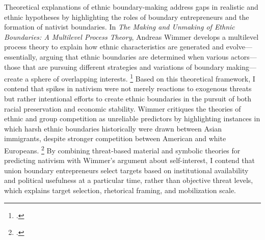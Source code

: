 \documentclass[12pt,a4paper]{article}
\begin{document}
Theoretical explanations of ethnic boundary-making address gaps in realistic and ethnic hypotheses by highlighting the roles of boundary entrepreneurs and the formation of nativist boundaries. In \textit{The Making and Unmaking of Ethnic Boundaries: A Multilevel Process Theory}, Andreas Wimmer develops a multilevel process theory to explain how ethnic characteristics are generated and evolve—essentially, arguing that ethnic boundaries are determined when various actors---those that are pursuing different strategies and variations of boundary making---create a sphere of overlapping interests. \footcite{wimmer_making_2008} Based on this theoretical framework, I contend that spikes in nativism were not merely reactions to exogenous threats but rather intentional efforts to create ethnic boundaries in the pursuit of both racial preservation and economic stability. Wimmer critiques the theories of ethnic and group competition as unreliable predictors by highlighting instances in which harsh ethnic boundaries historically were drawn between Asian immigrants, despite stronger competition between American and white Europeans. \footcite{wimmer_making_2008} By combining threat-based material and symbolic theories for predicting nativism with Wimmer's argument about self-interest, I contend that union boundary entrepreneurs select targets based on institutional availability and political usefulness at a particular time, rather than objective threat levels, which explains target selection, rhetorical framing, and mobilization scale.
\end{document}
